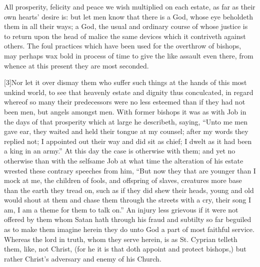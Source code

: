 All prosperity, felicity and peace we wish multiplied on each estate, as far as their own hearts’ desire is: but let men know that there is a God, whose eye beholdeth them in all their ways; a God, the usual and ordinary course of whose justice is to return upon the head of malice the same devices which it contriveth against others. The foul practices which have been used for the overthrow of bishops, may perhaps wax bold in process of time to give the like assault even there, from whence at this present they are most seconded.

[3]Nor let it over dismay them who suffer such things at the hands of this most unkind world, to see that heavenly estate and dignity thus conculcated, in regard whereof so many their predecessors were no less esteemed than if they had not been men, but angels amongst men. With  former bishops it was as with Job in the days of that prosperity which at large he describeth, saying,
 “Unto me men gave ear, they waited and held their tongue at my counsel; after my words they replied not; I appointed out their way and did sit as chief; I dwelt as it had been a king in an army.” At this day the case is otherwise with them; and yet no otherwise than with the selfsame Job at what time the alteration of his estate wrested these contrary speeches from him, “But now they that are younger than I mock at me, the children of fools, and offspring of slaves, creatures more base than the earth they tread on, such as if they did shew their heads, young and old would shout at them and chase them through the streets with a cry, their song I am, I am a theme for them to talk on.” An injury less grievous if it were not offered by them whom Satan hath through his fraud and subtilty so far beguiled as to make them imagine herein they do unto God a part of most faithful service. Whereas the lord in truth, whom they serve herein, is as St. Cyprian telleth them, like, not Christ, (for he it is that doth appoint and protect bishops,) but rather Christ’s adversary and enemy of his Church.

